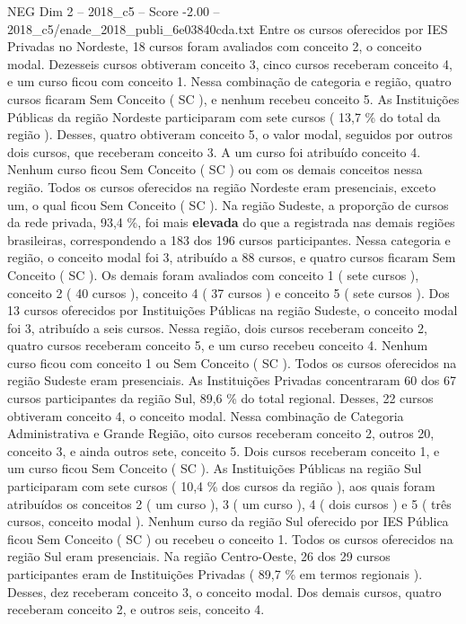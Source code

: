 \begin{textsample}{NEG Dim 2 – 2018\_c5 – Score -2.00 – 2018\_c5/enade\_2018\_publi\_6e03840cda.txt}
Entre os cursos oferecidos por IES Privadas no Nordeste, 18 cursos foram avaliados com conceito 2, o conceito modal.
Dezesseis cursos obtiveram conceito 3, cinco cursos receberam conceito 4, e um curso ficou com conceito 1.
Nessa combinação de categoria e região, quatro cursos ficaram Sem Conceito ( SC ), e nenhum recebeu conceito 5.
As Instituições Públicas da região Nordeste participaram com sete cursos ( 13,7 \% do total da região ).
Desses, quatro obtiveram conceito 5, o valor modal, seguidos por outros dois cursos, que receberam conceito 3.
A um curso foi atribuído conceito 4.
Nenhum curso ficou Sem Conceito ( SC ) ou com os demais conceitos nessa região.
Todos os cursos oferecidos na região Nordeste eram presenciais, exceto um, o qual ficou Sem Conceito ( SC ).
Na região Sudeste, a proporção de cursos da rede privada, 93,4 \%, foi mais \textbf{elevada} do que a registrada nas demais regiões brasileiras, correspondendo a 183 dos 196 cursos participantes.
Nessa categoria e região, o conceito modal foi 3, atribuído a 88 cursos, e quatro cursos ficaram Sem Conceito ( SC ).
Os demais foram avaliados com conceito 1 ( sete cursos ), conceito 2 ( 40 cursos ), conceito 4 ( 37 cursos ) e conceito 5 ( sete cursos ).
Dos 13 cursos oferecidos por Instituições Públicas na região Sudeste, o conceito modal foi 3, atribuído a seis cursos.
Nessa região, dois cursos receberam conceito 2, quatro cursos receberam conceito 5, e um curso recebeu conceito 4.
Nenhum curso ficou com conceito 1 ou Sem Conceito ( SC ).
Todos os cursos oferecidos na região Sudeste eram presenciais.
As Instituições Privadas concentraram 60 dos 67 cursos participantes da região Sul, 89,6 \% do total regional.
Desses, 22 cursos obtiveram conceito 4, o conceito modal.
Nessa combinação de Categoria Administrativa e Grande Região, oito cursos receberam conceito 2, outros 20, conceito 3, e ainda outros sete, conceito 5.
Dois cursos receberam conceito 1, e um curso ficou Sem Conceito ( SC ).
As Instituições Públicas na região Sul participaram com sete cursos ( 10,4 \% dos cursos da região ), aos quais foram atribuídos os conceitos 2 ( um curso ), 3 ( um curso ), 4 ( dois cursos ) e 5 ( três cursos, conceito modal ).
Nenhum curso da região Sul oferecido por IES Pública ficou Sem Conceito ( SC ) ou recebeu o conceito 1.
Todos os cursos oferecidos na região Sul eram presenciais.
Na região Centro-Oeste, 26 dos 29 cursos participantes eram de Instituições Privadas ( 89,7 \% em termos regionais ).
Desses, dez receberam conceito 3, o conceito modal.
Dos demais cursos, quatro receberam conceito 2, e outros seis, conceito 4.

\end{textsample}
